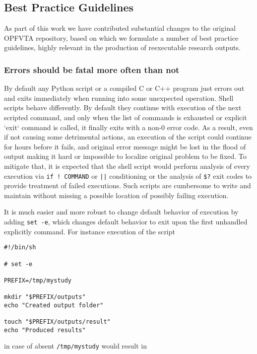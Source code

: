\subsection{Best Practice Guidelines}

As part of this work we have contributed substantial changes to the original OPFVTA repository, based on which we formulate a number of best practice guidelines, highly relevant in the production of reexecutable research outputs.

\subsubsection{Errors should be fatal more often than not}

By default any Python script or a compiled C or C++ program just errors out and exits immediately when running into some unexpected operation.
Shell scripts behave differently.
By default they continue with execution of the next scripted command, and only when the list of commands is exhausted or explicit `exit` command is called, it finally exits with a non-0 error code.
As a result, even if not causing some detrimental actions, an execution of the script could continue for hours before it fails, and original error message might be lost in the flood of output making it hard or impossible to localize original problem to be fixed.
To mitigate that, it is expected that the shell script would perform analysis of every execution via \texttt{if ! COMMAND} or \texttt{||} conditioning or the analysis of \texttt{\$?} exit codes to provide treatment of failed executions.
Such scripts are cumbersome to write and maintain without missing a possible location of possibly failing execution.

It is much easier and more robust to change default behavior of execution by adding \texttt{set -e}, which changes default behavior to exit upon the first unhandled explicitly command.
For instance execution of the script

\begin{verbatim}
#!/bin/sh

# set -e

PREFIX=/tmp/mystudy

mkdir "$PREFIX/outputs"
echo "Created output folder"

touch "$PREFIX/outputs/result"
echo "Produced results"
\end{verbatim}

in case of absent \texttt{/tmp/mystudy} would result in

